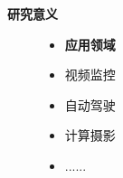 \documentclass[CJK,aspectratio=169]{beamer}  %
\begin{document}
	\begin{frame}
		{ \yahei \textbf{研究意义}}
		\begin{figure}
			\centering			
			\begin{minipage}{.4\columnwidth}
				\begin{itemize}
					\item {} \yahei \textbf{应用领域}
					
					\item[\checkmark]
					 \yahei 视频监控\textcolor{blue}{\citep{s20020495}}
					
					
					
					
					\item[\checkmark]
					 \yahei 自动驾驶\textcolor{blue}{\citep{li2021deep}}
					
					\item[\checkmark]
					 \yahei 计算摄影\textcolor{blue}{\citep{ma2022toward}}
					
					\item[\checkmark]
					 \yahei ......
					

\end{itemize}
\end{minipage}
\end{figure}
\end{frame}
\end{document}
